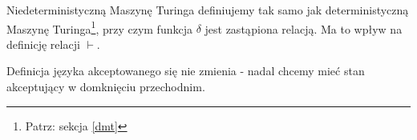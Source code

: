 \begin{definition}
    Niedeterministyczną Maszynę Turinga definiujemy tak samo jak deterministyczną Maszynę Turinga\footnote{Patrz: sekcja \ref{dmt}}, przy czym funkcja \( \delta \) jest zastąpiona relacją.
    Ma to wpływ na definicję relacji \( \vdash\).
    
    Definicja języka akceptowanego się nie zmienia - nadal chcemy mieć stan akceptujący w domknięciu przechodnim.
\end{definition}